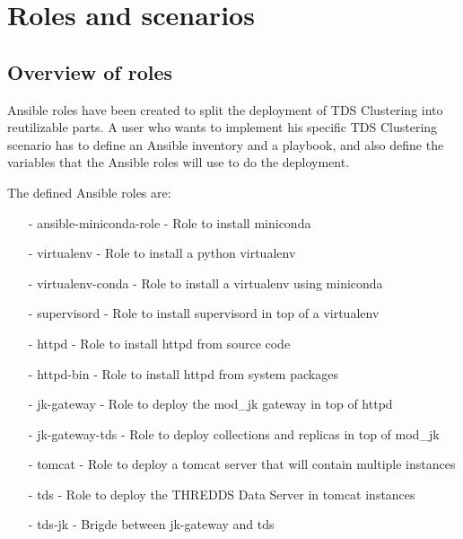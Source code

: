 \documentclass[a4paper,12pt]{article}
\begin{document}
\section{Roles and scenarios}

\subsection{Overview of roles}

Ansible roles have been created to split the deployment of TDS Clustering into reutilizable parts. A user who wants to implement his specific TDS Clustering scenario has to define an Ansible inventory and a playbook, and also define the variables that the Ansible roles will use to do the deployment.

The defined Ansible roles are:

\begin{itemize}
\item[-] ansible-miniconda-role - Role to install miniconda
\item[-] virtualenv - Role to install a python virtualenv
\item[-] virtualenv-conda - Role to install a virtualenv using miniconda
\item[-] supervisord - Role to install supervisord in top of a virtualenv
\item[-] httpd - Role to install httpd from source code
\item[-] httpd-bin - Role to install httpd from system packages
\item[-] jk-gateway - Role to deploy the mod\_jk gateway in top of httpd
\item[-] jk-gateway-tds - Role to deploy collections and replicas in top of mod\_jk
\item[-] tomcat - Role to deploy a tomcat server that will contain multiple instances
\item[-] tds - Role to deploy the THREDDS Data Server in tomcat instances
\item[-] tds-jk - Brigde between jk-gateway and tds
\end{itemize}
\end{document}
